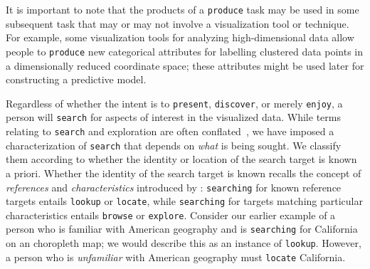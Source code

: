 It is important to note that the products of a {\tt produce} task may be used in some subsequent task that may or may not involve a visualization tool or technique.
For example, some visualization tools for analyzing high-dimensional data allow people to {\tt produce} new categorical attributes for labelling clustered data points in a dimensionally reduced coordinate space; these attributes might be used later for constructing a predictive model.

Regardless of whether the intent is to {\tt present}, {\tt discover}, or merely {\tt enjoy}, a person will {\tt search} for aspects of interest in the visualized data.
While terms relating to {\tt search} and exploration are often conflated~\cite{Marchionini2006,Toms2000}, we have imposed a characterization of {\tt search} that depends on {\it what} is being sought.
We classify them according to whether the identity or location of the search target is known a priori.
Whether the identity of the search target is known recalls the concept of {\it references} and {\it characteristics} introduced by \citet{Andrienko2006}: {\tt searching} for known reference targets entails {\tt lookup} or {\tt locate}, while {\tt searching} for targets matching particular characteristics entails {\tt browse} or {\tt explore}.
Consider our earlier example of a person who is familiar with American geography and is {\tt searching} for California on an choropleth map; we would describe this as an instance of {\tt lookup}.
However, a person who is {\it unfamiliar} with American geography must {\tt locate} California.

